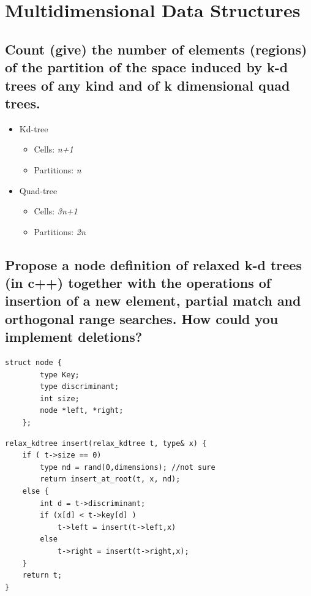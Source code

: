 \documentclass{article}
\begin{document}
\section{Multidimensional Data Structures}

\subsection{Count (give) the number of elements (regions) of the partition of the space
induced by k-d trees of any kind and of k dimensional quad trees.}

\begin{itemize}
    \item Kd-tree
        \begin{itemize}
            \item Cells: \textit{n+1}
            \item Partitions: \textit{n}
        \end{itemize}
    \item Quad-tree
        \begin{itemize}
            \item Cells: \textit{3n+1}
            \item Partitions: \textit{2n}
        \end{itemize}
\end{itemize}

\subsection{Propose a node definition of relaxed k-d trees (in c++) together with the
operations of insertion of a new element, partial match and orthogonal
range searches. How could you implement deletions?}


\begin{lstlisting}[caption=Class Node of relaxed kd-trees, style=myC]
    struct node {
        type Key;
        type discriminant;
        int size;
        node *left, *right;
    };
\end{lstlisting}



\begin{lstlisting}[caption=Insert of relaxed kd-trees, style=myC]
relax_kdtree insert(relax_kdtree t, type& x) {
    if ( t->size == 0)
        type nd = rand(0,dimensions); //not sure
        return insert_at_root(t, x, nd);
    else {
        int d = t->discriminant;
        if (x[d] < t->key[d] )
            t->left = insert(t->left,x)
        else 
            t->right = insert(t->right,x);
    }
    return t;
}
\end{lstlisting}
\end{document}
